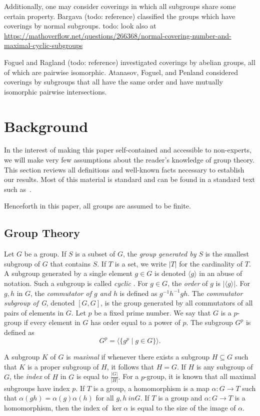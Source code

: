 \documentclass{amsart}
\numberwithin{equation} {section}
\theoremstyle{definition}
\begin{document}
Additionally, one may consider coverings in which all subgroups share some certain property. Bargava (todo: reference) classified the groups which have coverings by normal subgroups. todo: look also at \url{https://mathoverflow.net/questions/266368/normal-covering-number-and-maximal-cyclic-subgroups}

Foguel and Ragland (todo: reference) investigated coverings by abelian groups, all of which are pairwise isomorphic. Atanasov, Foguel, and Penland considered coverings by subgroups that all have the same order and have mutually isomorphic pairwise intersections. 

\section{Background} 

In the interest of making this paper self-contained and accessible to non-experts, we will make very few assumptions about the reader's knowledge of group theory. This section reviews all definitions and well-known facts necessary to establish our results. Most of this material is standard and can be found in a standard text such as~\cite{Dummit-Foote}.

Henceforth in this paper, all groups are assumed to be finite. 


\subsection{Group Theory}

Let $G$ be a group. If $S$ is a subset of $G$, the \textit{group generated by $S$} is the smallest subgroup of $G$ that contains $S$. If $T$ is a set, we write $|T|$ for the cardinality of $T$. A subgroup generated by a single element $g \in G$ is denoted $\langle g \rangle$ in an abuse of notation. Such a subgroup is called \textit{cyclic} . For $g \in G$, the \textit{order} of $g$ is $|\langle g \rangle|$.  For $g,h$ in $G$, the \textit{commutator of $g$ and $h$} is defined as $g^{-1}h^{-1}gh$. The \textit{commutator subgroup of G}, denoted $[G,G]$, is the group generated by all commutators of all pairs of elements in $G$. Let $p$ be a fixed prime number. We say that $G$ is a $p$-group if every element in $G$ has order equal to a power of $p$. The subgroup $G^p$ is defined as \[
G^p = \langle \{ g^p \mid g \in G \} \rangle.
\]

A subgroup $K$ of $G$ is \textit{maximal} if whenever there exists a subgroup $H \subseteq G$ such that $K$ is a proper subgroup of $H$, it follows that $H = G$. If $H$ is any subgroup of $G$, the \textit{index} of $H$ in $G$ is equal to $\displaystyle\frac{|G|}{|H|}.$ For a $p$-group, it is known that all maximal subgroups have index $p$. If $T$ is a group, a homomorphism is a map $\alpha: G \rightarrow T$ such that $\alpha(gh) = \alpha(g)\alpha(h)$ for all $g, h\ in G$. If $T$ is a group and $\alpha: G \rightarrow T$ is a homomorphism, then the index of $\ker \alpha$ is equal to the size of the image of $\alpha$. 
\end{document}
